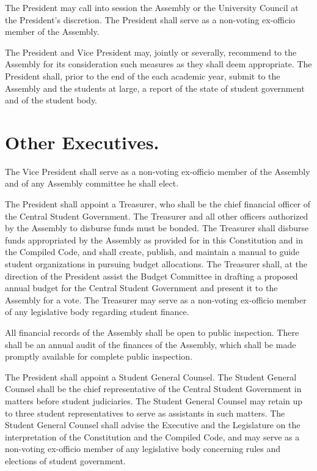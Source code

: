     The President may call into session the Assembly or the University Council at the President's discretion. The President shall serve as a non-voting ex-officio member of the Assembly.

    The President and Vice President may, jointly or severally, recommend to the Assembly for its consideration such measures as they shall deem appropriate. The President shall, prior to the end of the each academic year, submit to the Assembly and the students at large, a report of the state of student government and of the student body.

\section{Other Executives.}
    The Vice President shall serve as a non-voting ex-officio member of the Assembly and of any Assembly committee he shall elect.

   The President shall appoint a Treasurer, who shall be the chief financial officer of the Central Student Government. The Treasurer and all other officers authorized by the Assembly to disburse funds must be bonded. The Treasurer shall disburse funds appropriated by the Assembly as provided for in this Constitution and in the Compiled Code, and shall create, publish, and maintain a manual to guide student organizations in pursuing budget allocations. The Treasurer shall, at the direction of the President assist the Budget Committee in drafting a proposed annual budget for the Central Student Government and present it to the Assembly for a vote. The Treasurer may serve as a non-voting ex-officio member of any legislative body regarding student finance.

    All financial records of the Assembly shall be open to public inspection. There shall be an annual audit of the finances of the Assembly, which shall be made promptly available for complete public inspection.

    The President shall appoint a Student General Counsel. The Student General Counsel shall be the chief representative of the Central Student Government in matters before student judiciaries. The Student General Counsel may retain up to three student representatives to serve as assistants in such matters. The Student General Counsel shall advise the Executive and the Legislature on the interpretation of the Constitution and the Compiled Code, and may serve as a non-voting ex-officio member of any legislative body concerning rules and elections of student government.
    
